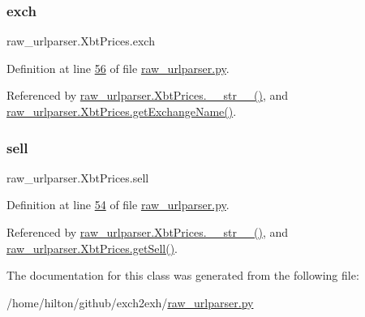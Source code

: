 \mbox{\label{classraw__urlparser_1_1_xbt_prices_a016bbd95465aaa14b5c434047df7b7fb}} 
\subsubsection{\texorpdfstring{exch}{exch}}
{\footnotesize\ttfamily raw\+\_\+urlparser.\+Xbt\+Prices.\+exch}



Definition at line \hyperlink{raw__urlparser_8py_source_l00056}{56} of file \hyperlink{raw__urlparser_8py_source}{raw\+\_\+urlparser.\+py}.



Referenced by \hyperlink{raw__urlparser_8py_source_l00074}{raw\+\_\+urlparser.\+Xbt\+Prices.\+\_\+\+\_\+str\+\_\+\+\_\+()}, and \hyperlink{raw__urlparser_8py_source_l00068}{raw\+\_\+urlparser.\+Xbt\+Prices.\+get\+Exchange\+Name()}.

\mbox{\label{classraw__urlparser_1_1_xbt_prices_a22b483cac27a5b17f9e7b265c219bb99}} 
\subsubsection{\texorpdfstring{sell}{sell}}
{\footnotesize\ttfamily raw\+\_\+urlparser.\+Xbt\+Prices.\+sell}



Definition at line \hyperlink{raw__urlparser_8py_source_l00054}{54} of file \hyperlink{raw__urlparser_8py_source}{raw\+\_\+urlparser.\+py}.



Referenced by \hyperlink{raw__urlparser_8py_source_l00074}{raw\+\_\+urlparser.\+Xbt\+Prices.\+\_\+\+\_\+str\+\_\+\+\_\+()}, and \hyperlink{raw__urlparser_8py_source_l00065}{raw\+\_\+urlparser.\+Xbt\+Prices.\+get\+Sell()}.



The documentation for this class was generated from the following file\+:\begin{DoxyCompactItemize}
\item 
/home/hilton/github/exch2exh/\hyperlink{raw__urlparser_8py}{raw\+\_\+urlparser.\+py}\end{DoxyCompactItemize}
